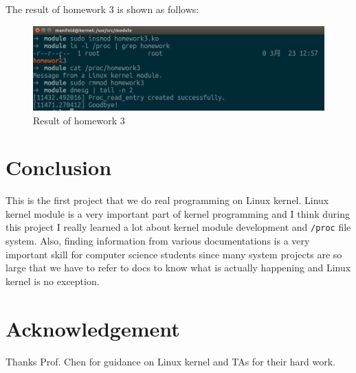 \documentclass{article}
\begin{document}
The result of homework 3 is shown as follows:
\begin{figure}[H]
\centering
\includegraphics[width=12cm]{hw3.png}
\caption{Result of homework 3}
\end{figure}


\section{Conclusion}
This is the first project that we do real programming on Linux kernel. Linux kernel module is a very important part of kernel programming and I think during this project I really learned a lot about kernel module development and \texttt{/proc} file system. Also, finding information from various documentations is a very important skill for computer science students since many system projects are so large that we have to refer to docs to know what is actually happening and Linux kernel is no exception.


\section*{Acknowledgement}
Thanks Prof. Chen for guidance on Linux kernel and TAs for their hard work.
\end{document}
